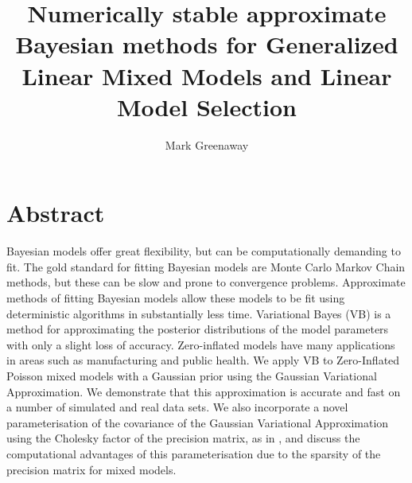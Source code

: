 \documentclass[PhD,stats]{usydthesis}[12pt]
\title{Numerically stable approximate Bayesian methods
    	 for Generalized Linear Mixed Models
			 and Linear Model Selection}
\author{Mark Greenaway}
\begin{document}
\makeatletter
 
 


\makeatother

\maketitle

\tableofcontents
\listoffigures

\section{Abstract}

Bayesian models offer great flexibility, but can be computationally demanding to fit. The gold standard for
fitting Bayesian models are Monte Carlo Markov Chain methods, but these can be slow and prone to convergence
problems. Approximate methods of fitting Bayesian models allow these models to be fit using deterministic
algorithms in substantially less time. Variational Bayes (VB) is a method for approximating the posterior
distributions of the model parameters with only a slight loss of accuracy.  Zero-inflated models have many
applications in areas such as manufacturing and public health. We apply VB to Zero-Inflated Poisson mixed
models with a Gaussian prior using the Gaussian Variational Approximation. We demonstrate that this
approximation is accurate and fast on a number of simulated and real data sets. We also incorporate a novel
parameterisation of the covariance of the Gaussian Variational Approximation using the Cholesky factor of the
precision matrix, as in \cite{Tan2016}, and discuss the computational advantages of this parameterisation due
to the sparsity of the precision matrix for mixed models.
\end{document}

